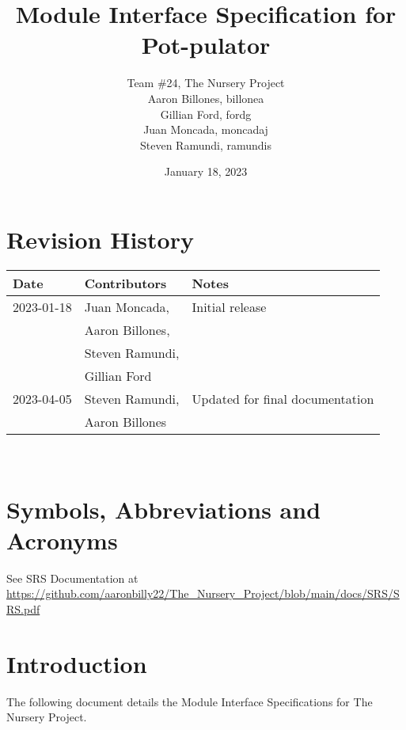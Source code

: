 \documentclass[12pt, titlepage]{article}
\begin{document}
\title{Module Interface Specification for Pot-pulator}

\author{Team \#24, The Nursery Project\\Aaron Billones, billonea\\Gillian Ford, fordg\\Juan Moncada, moncadaj\\Steven Ramundi, ramundis}
\date{January 18, 2023}

\maketitle


\section{Revision History}

\begin{tabularx}{\textwidth}{p{3cm}p{4cm}X}
  \toprule {\bf Date} & {\bf Contributors} & {\bf Notes}\\
  \midrule
  2023-01-18 & Juan Moncada,& Initial release\\&Aaron Billones,\\&Steven Ramundi,\\&Gillian Ford \\
  2023-04-05 & Steven Ramundi, & Updated for final documentation\\&Aaron Billones\\
  \bottomrule
  \end{tabularx}

~\newpage

\section{Symbols, Abbreviations and Acronyms}

See SRS Documentation at \url{https://github.com/aaronbilly22/The\_Nursery\_Project/blob/main/docs/SRS/SRS.pdf}


\newpage

\tableofcontents

\newpage


\section{Introduction}

The following document details the Module Interface Specifications for
The Nursery Project.
\end{document}
